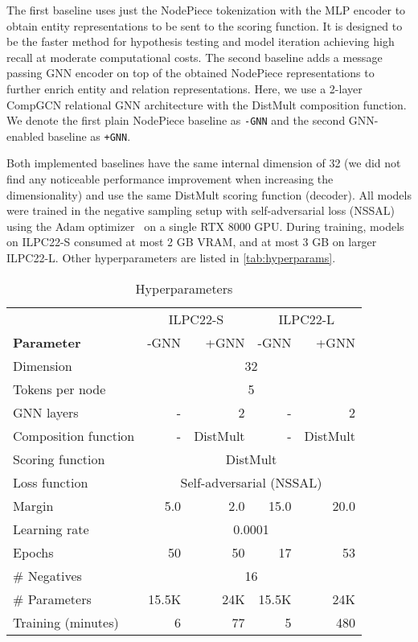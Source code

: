 \documentclass[sigconf,screen]{acmart}
\begin{document}
The first baseline uses just the NodePiece tokenization with the MLP encoder to obtain entity representations to be sent to the scoring function. 
It is designed to be the faster method for hypothesis testing and model iteration achieving high recall at moderate computational costs.
The second baseline adds a message passing GNN encoder on top of the obtained NodePiece representations to further enrich entity and relation representations.
Here, we use a 2-layer CompGCN \cite{DBLP:conf/iclr/VashishthSNT20} relational GNN architecture with the DistMult \cite{DBLP:journals/corr/YangYHGD14a} composition function.
We denote the first plain NodePiece baseline as \texttt{-GNN} and the second GNN-enabled baseline as \texttt{+GNN}.

Both implemented baselines have the same internal dimension of 32 (we did not find any noticeable performance improvement when increasing the dimensionality) and use the same DistMult scoring  function (decoder).
All models were trained in the negative sampling setup with self-adversarial loss (NSSAL) \cite{DBLP:conf/iclr/SunDNT19} using the Adam optimizer~\cite{DBLP:journals/corr/KingmaB14} on a single RTX 8000 GPU. 
During training, models on ILPC22-S consumed at most 2 GB VRAM, and at most 3 GB on larger ILPC22-L.
Other hyperparameters are listed in \autoref{tab:hyperparams}.

\begin{table}[]
    \centering
    \begin{tabular}{lrrrr}
        \toprule
         & \multicolumn{2}{c}{ILPC22-S} & \multicolumn{2}{c}{ILPC22-L} \\
        \textbf{Parameter} & -GNN & +GNN               & -GNN & +GNN \\
        \midrule
        Dimension       & \multicolumn{4}{c}{32}\\
        Tokens per node & \multicolumn{4}{c}{5}\\
        GNN layers      & -         & 2	    & -     & 2\\
        Composition function & -    & DistMult & - & DistMult\\
        Scoring function & \multicolumn{4}{c}{DistMult}\\
        Loss function   & \multicolumn{4}{c}{Self-adversarial (NSSAL)}\\
        Margin          & 5.0       & 2.0	& 15.0  & 20.0\\
        Learning rate   & \multicolumn{4}{c}{0.0001}\\
        Epochs          & 50     & 50	& 17 & 53\\
        \# Negatives    & \multicolumn{4}{c}{16}\\
        \# Parameters   & 15.5K & 24K & 15.5K & 24K\\
        Training (minutes)   & 6     & 77	& 5 & 480\\
        \bottomrule 
    \end{tabular}
    \caption{Hyperparameters}
    \label{tab:hyperparams}
\end{table}
\end{document}
